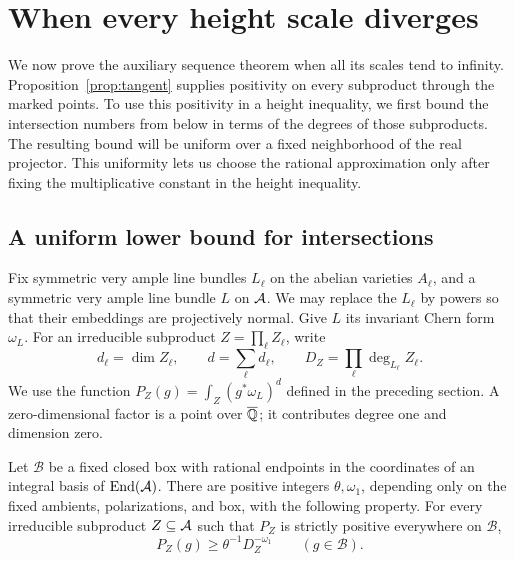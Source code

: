 \section{When every height scale diverges}
\label{sec:high}

We now prove the auxiliary sequence theorem when all its scales tend to
infinity.  Proposition~\ref{prop:tangent} supplies positivity on every
subproduct through the marked points.  To use this positivity in a height
inequality, we first bound the intersection numbers from below in terms
of the degrees of those subproducts.  The resulting bound will be uniform
over a fixed neighborhood of the real projector.  This uniformity lets us
choose the rational approximation only after fixing the multiplicative
constant in the height inequality.

\subsection{A uniform lower bound for intersections}

Fix symmetric very ample line bundles $L_\ell$ on the abelian varieties
$A_\ell$, and a symmetric very ample line bundle $L$ on $\mathcal A$.  We may
replace the $L_\ell$ by powers so that their embeddings are projectively
normal.  Give $L$ its invariant Chern form $\omega_L$.
For an irreducible subproduct $Z=\prod_\ell Z_\ell$, write
\[
 d_\ell=\dim Z_\ell,\qquad d=\sum_\ell d_\ell,
 \qquad D_Z=\prod_\ell\deg_{L_\ell}Z_\ell.
\]
We use the function $P_Z(g)=\int_Z(g^*\omega_L)^d$ defined in the
preceding section.  A zero-dimensional factor is a point over $\overline{\mathbb Q}$;
it contributes degree one and dimension zero.

\begin{lemma}\label{lemma:intersection-lower-bound}
Let $\mathcal B$ be a fixed closed box with rational endpoints in the
coordinates of an integral basis of $\operatorname{End}(\mathcal A)$.  There are positive
integers $\theta,\omega_1$, depending only on the fixed ambients,
polarizations, and box, with the following property.  For every
irreducible subproduct $Z\subseteq\mathcal A$ such that $P_Z$ is strictly
positive everywhere on $\mathcal B$,
\begin{equation}\label{eq:intersection-lower-bound}
 P_Z(g)\ge \theta^{-1}D_Z^{-\omega_1}
 \qquad (g\in\mathcal B).
\end{equation}
\end{lemma}

